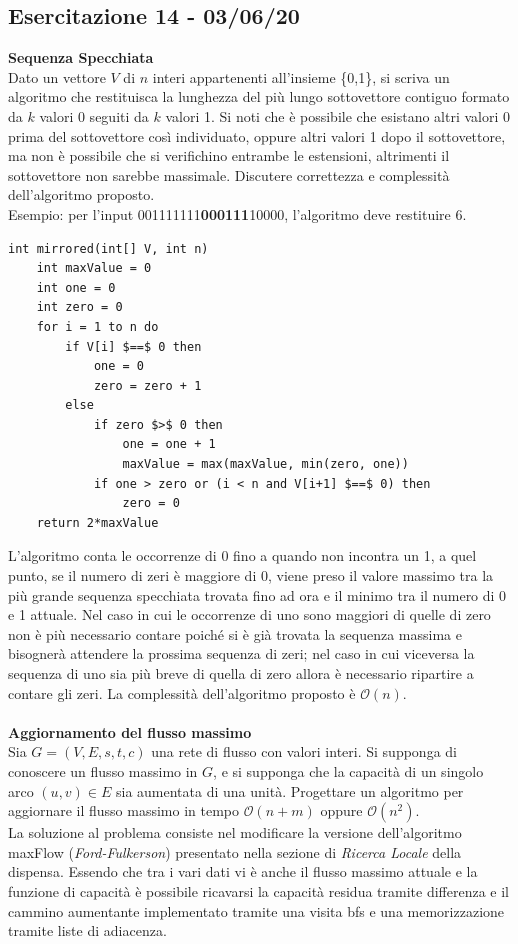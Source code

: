 \documentclass[../cheatSheetAlgoritmi.tex]{subfiles}
\begin{document}
\subsection{Esercitazione 14 - 03/06/20}
\textbf{Sequenza Specchiata}\\
Dato un vettore $V$ di $n$ interi appartenenti all'insieme \{0,1\}, si scriva un algoritmo che restituisca la lunghezza del più lungo sottovettore contiguo formato da $k$ valori 0 seguiti da $k$ valori 1. Si noti che è possibile che esistano altri valori 0 prima del sottovettore così individuato, oppure altri valori 1 dopo il sottovettore, ma non è possibile che si verifichino entrambe le estensioni, altrimenti il sottovettore non sarebbe massimale. Discutere correttezza e complessità dell'algoritmo proposto.\\
Esempio: per l’input 001111111\textbf{000111}10000, l'algoritmo deve restituire 6.\\
\begin{lstlisting}[caption=Sequenza Specchiata]
int mirrored(int[] V, int n)
	int maxValue = 0
	int one = 0
	int zero = 0
	for i = 1 to n do
		if V[i] $==$ 0 then
			one = 0
			zero = zero + 1
		else
			if zero $>$ 0 then
				one = one + 1
				maxValue = max(maxValue, min(zero, one))
			if one > zero or (i < n and V[i+1] $==$ 0) then
				zero = 0
	return 2*maxValue
\end{lstlisting}
L'algoritmo conta le occorrenze di 0 fino a quando non incontra un 1, a quel punto, se il numero di zeri è maggiore di 0, viene preso il valore massimo tra la più grande sequenza specchiata trovata fino ad ora e il minimo tra il numero di 0 e 1 attuale. Nel caso in cui le occorrenze di uno sono maggiori di quelle di zero non è più necessario contare poiché si è già trovata la sequenza massima e bisognerà attendere la prossima sequenza di zeri; nel caso in cui viceversa la sequenza di uno sia più breve di quella di zero allora è necessario ripartire a contare gli zeri. La complessità dell'algoritmo proposto è $\mathcal{O}(n)$.\\\\
\textbf{Aggiornamento del flusso massimo}\\
Sia $G= (V, E, s, t, c)$ una rete di flusso con valori interi. Si supponga di conoscere un flusso massimo in $G$, e si supponga che la capacità di un singolo arco $(u, v) \in E$ sia aumentata di una unità. Progettare un algoritmo per aggiornare il flusso massimo in tempo $\mathcal{O}(n+m)$ oppure $\mathcal{O}(n^{2})$.\\
La soluzione al problema consiste nel modificare la versione dell'algoritmo maxFlow (\emph{Ford-Fulkerson}) presentato nella sezione di \emph{Ricerca Locale} della dispensa. Essendo che tra i vari dati vi è anche il flusso massimo attuale e la funzione di capacità è possibile ricavarsi la capacità residua tramite differenza e il cammino aumentante implementato tramite una visita bfs e una memorizzazione tramite liste di adiacenza.
\end{document}
